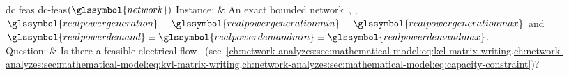 \begin{problem}[framed]{\acrlong{dc} \acrlong{feas} \gls{dc}-\gls{feas}$
(\glssymbol{network})$}%
  Instance: & An exact bounded network~\dcnetworktuple, \ie,
  $
  \glssymbol{realpowergeneration}
  \equiv
  \glssymbol{realpowergenerationmin}
  \equiv
  \glssymbol{realpowergenerationmax}$
  and~$
  \glssymbol{realpowerdemand}
  \equiv
  \glssymbol{realpowerdemandmin}
  \equiv
  \glssymbol{realpowerdemandmax}
  $.
  \\
  Question: & Is there a feasible electrical flow~
  (see~\cref{ch:network-analyzes:sec:mathematical-model:eq:kcl-matrix-writing,ch:network-analyzes:sec:mathematical-model:eq:kvl-matrix-writing,ch:network-analyzes:sec:mathematical-model:eq:capacity-constraint})?
\end{problem}%
